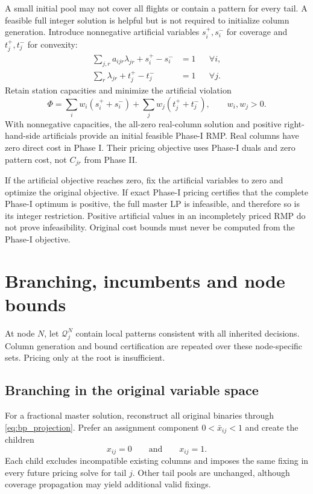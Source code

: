 A small initial pool may not cover all flights or contain a pattern for every
tail. A feasible full integer solution is helpful but is not required to
initialize column generation. Introduce nonnegative artificial variables
$s_i^+,s_i^-$ for coverage and $t_j^+,t_j^-$ for convexity:
\begin{align}
 \sum_{j,r}a_{ijr}\lambda_{jr}+s_i^+-s_i^-&=1 &&\forall i,\\
 \sum_r\lambda_{jr}+t_j^+-t_j^-&=1 &&\forall j.
\end{align}
Retain station capacities and minimize the artificial violation
\begin{equation}
 \Phi=\sum_i w_i(s_i^++s_i^-)+\sum_j w_j(t_j^++t_j^-),
 \qquad w_i,w_j>0.
 \label{eq:bp_phase_one_obj}
\end{equation}
With nonnegative capacities, the all-zero real-column solution and positive
right-hand-side artificials provide an initial feasible Phase-I RMP. Real
columns have zero direct cost in Phase I. Their pricing objective uses
Phase-I duals and zero pattern cost, not $C_{jr}$ from Phase II.

If the artificial objective reaches zero, fix the artificial variables to
zero and optimize the original objective. If exact Phase-I pricing certifies
that the complete Phase-I optimum is positive, the full master LP is
infeasible, and therefore so is its integer restriction. Positive artificial
values in an incompletely priced RMP do not prove infeasibility. Original
cost bounds must never be computed from the Phase-I objective.

\section{Branching, incumbents and node bounds}
\label{sec:bp_branching}

At node $N$, let $\mathcal Q_j^N$ contain local patterns consistent with all
inherited decisions. Column generation and bound certification are repeated
over these node-specific sets. Pricing only at the root is insufficient.

\subsection{Branching in the original variable space}

For a fractional master solution, reconstruct all original binaries through
\eqref{eq:bp_projection}. Prefer an assignment component
$0<\bar x_{ij}<1$ and create the children
\begin{equation}
 x_{ij}=0\qquad\text{and}\qquad x_{ij}=1.
 \label{eq:bp_x_branch}
\end{equation}
Each child excludes incompatible existing columns and imposes the same fixing
in every future pricing solve for tail $j$. Other tail pools are unchanged,
although coverage propagation may yield additional valid fixings.

